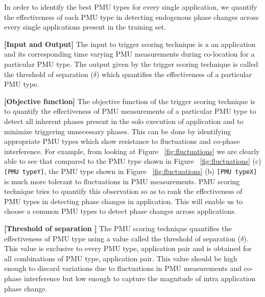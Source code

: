 \documentclass{sig-alternate}
\begin{document}
In order to identify the best PMU types for every single application, we quantify the effectiveness of each PMU type in detecting endogenous phase changes across every single applications present in the training set. 

\textbf{[Input and Output]} The input to trigger scoring technique is a an application and its corresponding time varying PMU measurements during co-location for a particular PMU type. The output given by the trigger scoring technique is called the threshold of separation ($\delta$) which quantifies the effectiveness of a particular PMU type.

\textbf{[Objective function]} The objective function of the trigger scoring technique is to quantify the effectiveness of PMU measurements of a particular PMU type to detect all inherent phases present in the solo execution of application and to  minimize triggering unnecessary phases. This can be done by identifying appropriate PMU types which show resistance to fluctuations and co-phase interference. For example, from looking at Figure ~\ref{fig:fluctuations} we are clearly able to see that compared to the PMU type shown in Figure ~\ref{fig:fluctuations} (c) \texttt{[PMU typeY]}, the PMU type shown in Figure ~\ref{fig:fluctuations} (b) \texttt{[PMU typeX]} is much more tolerant to fluctuations in PMU measurements. PMU scoring technique tries to quantify this observation so as to rank the effectiveness of PMU types in detecting phase changes in application. This will enable us to choose a common PMU types to detect phase changes across applications. 

\textbf{[Threshold of separation ]} The PMU scoring technique quantifies the effectiveness of PMU type using a value called the threshold of separation ($\delta$). This value is exclusive to every PMU type, application pair and is obtained for all combinations of PMU type, application pair. This value should be high enough to discard variations due to fluctuations in PMU measurements and co-phase interference but low enough to capture the magnitude of intra application phase change. 
\end{document}
